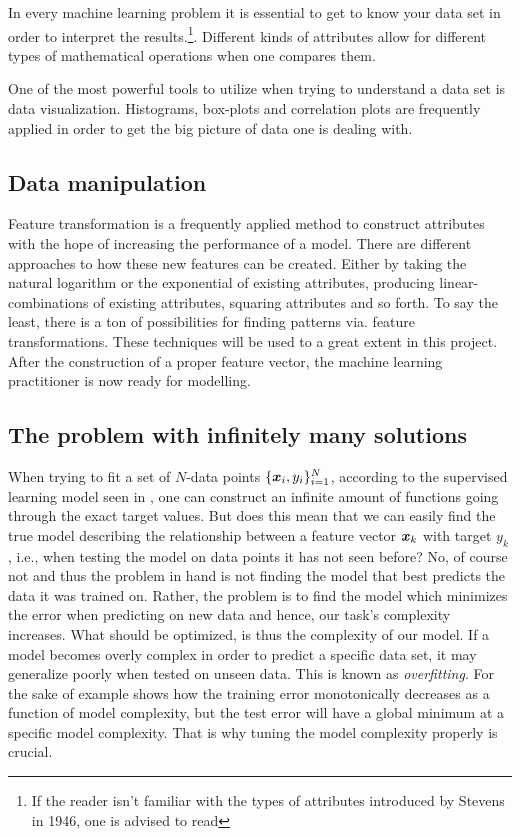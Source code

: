 In every machine learning problem it is essential to get to know your data set in order to interpret the results.\footnote{If the reader isn't familiar with the types of attributes introduced by Stevens in 1946, one is advised to read }. 
Different kinds of attributes allow for different types of mathematical operations when one compares them. 

One of the most powerful tools to utilize when trying to understand a data set is data visualization. Histograms, box-plots and correlation plots are frequently applied in order to get the big picture of data one is dealing with. 


\subsection{Data manipulation}
Feature transformation  is a frequently applied method to construct attributes with the hope of increasing the performance of a model. There are different approaches to how these new features can be created. Either by taking the natural logarithm or the exponential of existing attributes, producing linear-combinations of existing attributes, squaring attributes and so forth. To say the least, there is a ton of possibilities for finding patterns via. feature transformations. These techniques will be used to a great extent in this project. After the construction of a proper feature vector, the machine learning practitioner is now ready for modelling. 


\subsection{The problem with infinitely many solutions}\label{sec:manysolutions}
When trying to fit a set of $N$-data points $\{\bm{x}_i,y_i\}_{i=1}^N$, according to the supervised learning model seen in , one can construct an infinite amount of functions going through the exact target values. But does this mean that we can easily find the true model describing the relationship between a feature vector $\bm{x}_k$ with target $y_k$, i.e., when testing the model on data points it has not seen before? No, of course not and thus the problem in hand is not finding the model that best predicts the data it was trained on. Rather, the problem is to find the model which minimizes the error when predicting on new data and hence, our task's complexity increases. What should be optimized, is thus the complexity of our model. If a model becomes overly complex in order to predict a specific data set, it may generalize poorly when tested on unseen data. This is known as \emph{overfitting}. For the sake of example  shows how the training error monotonically decreases as a function of model complexity, but the test error will have a global minimum at a specific model complexity. That is why tuning the model complexity properly is crucial.


